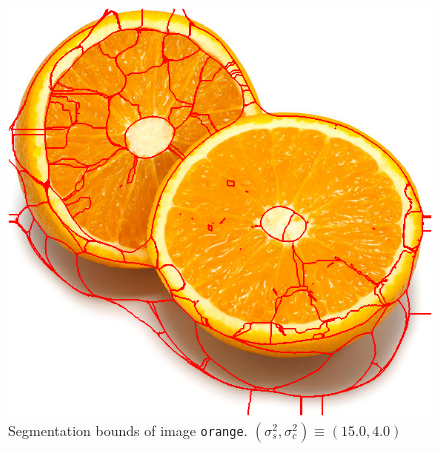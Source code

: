 {\begin{minipage}{\linewidth}
\begin{minipage}{0.45\linewidth}
\begin{figure}[H]
      \includegraphics[scale=0.4]{./images/02/orange/meanshift2_15_4.png}
      \caption{Segmentation bounds of image \texttt{orange}.
        $(\sigma_s^2, \sigma_c^2) \equiv (15.0, 4.0)$}
      \label{fig:02_orange2_15_4}
    \end{figure}
  \end{minipage}
\end{minipage}
}

